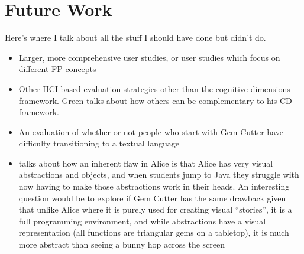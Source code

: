 \label{concl}


\section{Future Work}

Here's where I talk about all the stuff I should have done but didn't do. 

\begin{itemize}
\item Larger, more comprehensive user studies, or user studies which focus on different FP concepts
\item Other HCI based evaluation strategies other than the cognitive dimensions framework.  Green talks about how others can be complementary to his CD framework.
\item An evaluation of whether or not people who start with Gem Cutter have difficulty transitioning to a textual language
\item \cite{brown08} talks about how an inherent flaw in Alice is that Alice has very visual abstractions and objects, and 
when students jump to Java they struggle with now having to make those abstractions work in their heads.  An interesting question
would be to explore if Gem Cutter has the same drawback given that unlike Alice where it is purely used for creating visual
``stories'', it is a full programming environment, and while abstractions have a visual representation (all functions are 
triangular gems on a tabletop), it is much more abstract than seeing a bunny hop across the screen
\end{itemize} 